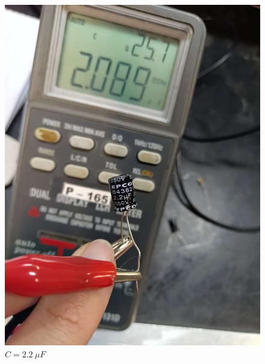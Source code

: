 \begin{figure}[H]
\begin{minipage}{0.29\textwidth}
    \includegraphics[width=\textwidth,trim={0cm 10cm 0cm 0cm},clip]{Imagenes/MedCap1Exp2.jpeg}
    \caption*{$C=2.2~\mu F$}
    \end{minipage}
    \hspace*{\fill}
    \begin{minipage}{0.29\textwidth}
    \centering

\end{minipage}
\end{figure}
